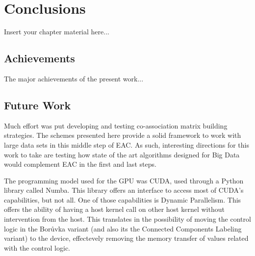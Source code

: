 
\chapter{Conclusions}
\label{chapter:conclusions}

Insert your chapter material here...


\section{Achievements}
\label{section:achievements}

The major achievements of the present work...


\section{Future Work}
\label{section:future}

Much effort was put developing and testing co-association matrix building strategies.
The schemes presented here provide a solid framework to work with large data sets in this middle step of EAC.
As such, interesting directions for this work to take are testing how state of the art algorithms designed for Big Data would complement EAC in the first and last steps.

The programming model used for the GPU was CUDA, used through a Python library called Numba.
This library offers an interface to access most of CUDA's capabilities, but not all.
One of those capabilities is Dynamic Parallelism.
This offers the ability of having a host kernel call on other host kernel without intervention from the host.
This translates in the possibility of moving the control logic in the Borůvka variant (and also its the Connected Components Labeling variant) to the device, effectevely removing the memory transfer of values related with the control logic.

